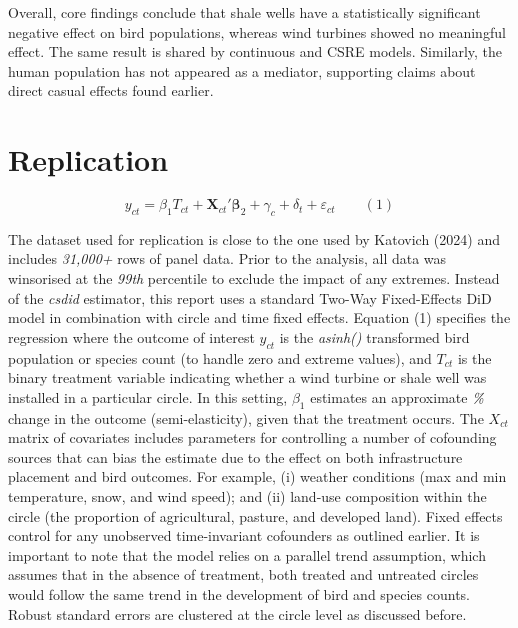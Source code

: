 \documentclass{article}
\begin{document}
\addlinespace

Overall, core findings conclude that shale wells have a statistically significant negative effect on bird populations, whereas wind turbines showed no meaningful effect. The same result is shared by continuous and CSRE models. Similarly, the human population has not appeared as a mediator, supporting claims about direct casual effects found earlier.

\section{Replication}

\addlinespace
\[
y_{ct} = \beta_1 T_{ct} + \mathbf{X}_{ct}' \boldsymbol{\beta}_2 + \gamma_c + \delta_t + \varepsilon_{ct} \hspace{2em} (1)
\]
\addlinespace

The dataset used for replication is close to the one used by Katovich (2024) and includes \textit{31,000+} rows of panel data. Prior to the analysis, all data was winsorised at the \textit{99th} percentile to exclude the impact of any extremes. Instead of the \textit{csdid} estimator, this report uses a standard Two-Way Fixed-Effects DiD model in combination with circle and time fixed effects. Equation (1) specifies the regression where the outcome of interest \( y_{ct} \) is the \textit{asinh()} transformed bird population or species count (to handle zero and extreme values), and \( T_{ct} \) is the binary treatment variable indicating whether a wind turbine or shale well was installed in a particular circle. In this setting, \( \beta_1 \) estimates an approximate \textit{\%} change in the outcome (semi-elasticity), given that the treatment occurs. The \( X_{ct} \) matrix of covariates includes parameters for controlling a number of cofounding sources that can bias the estimate due to the effect on both infrastructure placement and bird outcomes. For example, (i) weather conditions (max and min temperature, snow, and wind speed); and (ii) land-use composition within the circle (the proportion of agricultural, pasture, and developed land). Fixed effects control for any unobserved time-invariant cofounders as outlined earlier. It is important to note that the model relies on a parallel trend assumption, which assumes that in the absence of treatment, both treated and untreated circles would follow the same trend in the development of bird and species counts. Robust standard errors are clustered at the circle level as discussed before.
\end{document}
